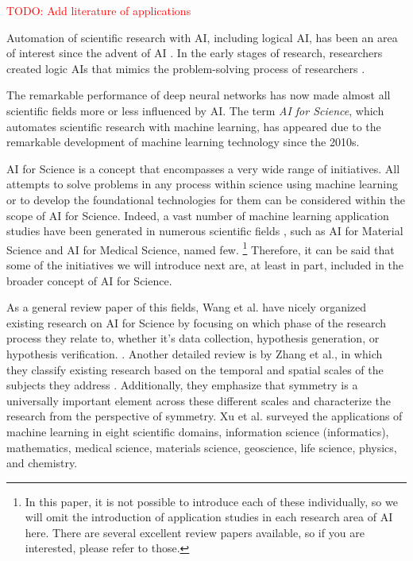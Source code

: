 \textcolor{red}{TODO: Add literature of applications}

Automation of scientific research with AI, including logical AI, has been an area of interest since the advent of AI \cite{langley1987scientific}. In the early stages of research, researchers created logic AIs that mimics the problem-solving process of researchers \cite{lindsay1993dendral}.

The remarkable performance of deep neural networks has now made almost all scientific fields more or less influenced by AI. The term \textit{AI for Science}, which automates scientific research with machine learning, has appeared due to the remarkable development of machine learning technology since the 2010s. 

AI for Science is a concept that encompasses a very wide range of initiatives. All attempts to solve problems in any process within science using machine learning or to develop the foundational technologies for them can be considered within the scope of AI for Science. Indeed, a vast number of machine learning application studies have been generated in numerous scientific fields \cite{xu2021artificial}, such as AI for Material Science and AI for Medical Science, named few.
\footnote{In this paper, it is not possible to introduce each of these individually, so we will omit the introduction of application studies in each research area of AI here. There are several excellent review papers available, so if you are interested, please refer to those.}
Therefore, it can be said that some of the initiatives we will introduce next are, at least in part, included in the broader concept of AI for Science.

As a general review paper of this fields, Wang et al. have nicely organized existing research on AI for Science by focusing on which phase of
the research process they relate to, whether it’s data collection, hypothesis generation, or hypothesis
verification. \cite{wang2023scientific}. Another detailed review is by Zhang et al., in which they classify existing research based on the temporal and spatial scales of the subjects they address \cite{zhang2023artificial}. Additionally, they emphasize that symmetry is a universally important element across
these different scales and characterize the research from the perspective of symmetry. Xu et al. \cite{xu2021artificial} surveyed the applications of machine learning in eight scientific domains, information science (informatics), mathematics, medical science,
materials science, geoscience, life science, physics, and chemistry.

